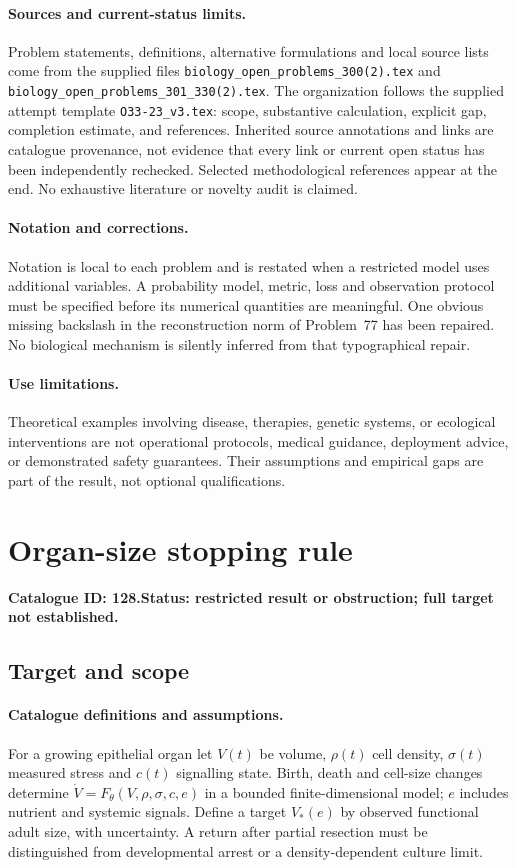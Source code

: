 \documentclass[11pt]{article}
\begin{document}
\paragraph{Sources and current-status limits.}
Problem statements, definitions, alternative formulations and local source lists
come from the supplied files
\texttt{biology\_open\_problems\_300(2).tex} and
\texttt{biology\_open\_problems\_301\_330(2).tex}.
The organization follows the supplied attempt template
\texttt{O33-23\_v3.tex}: scope, substantive calculation, explicit gap,
completion estimate, and references. Inherited source annotations and links are
catalogue provenance, not evidence that every link or current open status has
been independently rechecked. Selected methodological references appear at the
end. No exhaustive literature or novelty audit is claimed.

\paragraph{Notation and corrections.}
Notation is local to each problem and is restated when a restricted model uses
additional variables. A probability model, metric, loss and observation protocol
must be specified before its numerical quantities are meaningful. One obvious
missing backslash in the reconstruction norm of Problem~77 has been repaired.
No biological mechanism is silently inferred from that typographical repair.

\paragraph{Use limitations.}
Theoretical examples involving disease, therapies, genetic systems, or ecological
interventions are not operational protocols, medical guidance, deployment advice,
or demonstrated safety guarantees. Their assumptions and empirical gaps are part
of the result, not optional qualifications.

\setcounter{section}{127}
\section{Organ-size stopping rule}
\label{prob:128}
\noindent\textbf{Catalogue ID: 128.}\quad \textbf{Status: restricted result or obstruction; full target not established.}
\subsection{Target and scope}
\paragraph{Catalogue definitions and assumptions.}
For a growing epithelial organ let $V(t)$ be volume, $\rho(t)$ cell density, $\sigma(t)$ measured stress and $c(t)$ signalling state. Birth, death and cell-size changes determine $\dot V=F_\theta(V,\rho,\sigma,c,e)$ in a bounded finite-dimensional model; $e$ includes nutrient and systemic signals. Define a target $V_*(e)$ by observed functional adult size, with uncertainty. A return after partial resection must be distinguished from developmental arrest or a density-dependent culture limit.
\end{document}
